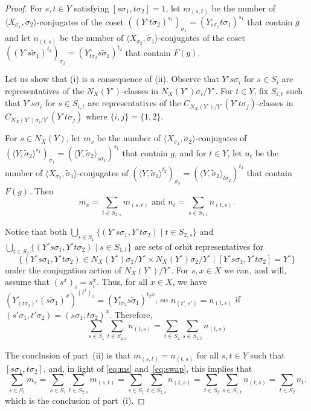 \documentclass[11pt]{article}
\numberwithin{equation}{section}
\theoremstyle{shdefinition}
\theoremstyle{shplain}
\newcommand{\s}{\sigma}
\newcommand{\ws}{\widetilde{\sigma}}
\newcommand{\<}{\langle}
\renewcommand{\>}{\rangle}
\renewcommand{\:}{\colon}
\begin{document}
\begin{proof}
For $s,t \in Y$ satisfying $[s\s_1,t\s_2]=1$, let $m_{(s,t)}$ be the number of $\<X_{\s_1},\ws_2\>$-conjugates of the coset $((Y^\circ t\ws_2)^{s_1})_{\s_1} = (Y^\circ_{s\s_2}t\ws_1)^{s_1}$ that contain $g$ and let $n_{(t,s)}$ be the number of $\<X_{\s_2},\ws_1\>$-conjugates of the coset $((Y^\circ s\ws_1)^{t_2})_{\s_2} = (Y^\circ_{t\s_2}s\ws_1)^{t_2}$ that contain $F(g)$. 

Let us show that (i) is a consequence of (ii). Observe that $Y^\circ s\s_i$ for $s \in S_i$ are representatives of the $N_X(Y^\circ)$-classes in $N_X(Y^\circ)\s_i/Y^\circ$. For $t \in Y$, fix $S_{i,t}$ such that $Y^\circ s\s_i$ for $s \in S_{i,t}$ are representatives of the $C_{N_X(Y^\circ)/Y^\circ}(Y^\circ t\s_j)$-classes in $C_{N_X(Y^\circ)\s_i/Y^\circ}(Y^\circ t\s_j)$ where $\{ i,j \} = \{1,2\}$.

For $s \in N_X(Y)$, let $m_s$ be the number of $\<X_{\s_1},\ws_2\>$-conjugates of $(\<Y,\ws_2\>^{s_1})_{\s_1} = (\<Y,\ws_2\>_{s\s_1})^{s_1}$ that contain $g$, and for $t \in Y$, let $n_t$ be the number of $\<X_{\s_2},\ws_1\>$-conjugates of $(\<Y,\ws_1\>^{t_2})_{\s_2} = (\< Y,\ws_2\>_{t\s_2})^{t_2}$ that contain $F(g)$. Then
\begin{equation} \label{eq:ms}
\text{$m_s = \sum_{t \in S_{2,s}} m_{(s,t)}$ and $n_t = \sum_{s \in S_{1,t}} n_{(t,s)}$.}
\end{equation}

Notice that both $\bigcup_{s \in S_1}\{ (Y^\circ s\s_1, Y^\circ t\s_2) \mid t \in S_{2,s} \}$ and $\bigcup_{t \in S_2}\{ (Y^\circ s\s_1, Y^\circ t\s_2) \mid s \in S_{1,t} \}$ are sets of orbit representatives for 
\[
\{ (Y^\circ s\s_1, Y^\circ t\s_2) \in N_X(Y^\circ)\s_1/Y^\circ \times N_X(Y^\circ)\s_2/Y^\circ \mid [Y^\circ s\s_1, Y^\circ t\s_2] = Y^\circ \}
\] 
under the conjugation action of $N_X(Y^\circ)/Y^\circ$. For $s, x \in X$ we can, and will, assume that $(s^x)_i = s_i^x$. Thus, for all $x \in X$, we have $(Y^\circ_{(t\s_2)^x}(s\ws_1)^x)^{(t^x)_2} = (Y^\circ_{t\s_2}s\ws_1)^{t_2x}$, so $n_{(t',s')} = n_{(t,s)}$ if $(s'\s_1,t'\s_2) = (s\s_1,t\s_2)^x$. Therefore,
\begin{equation} \label{eq:swap}
\sum_{s \in S_1}\sum_{t \in S_{2,s}} n_{(t,s)} = \sum_{t \in S_2}\sum_{s \in S_{1,t}} n_{(t,s)} 
\end{equation}

The conclusion of part~(ii) is that $m_{(s,t)} = n_{(t,s)}$ for all $s,t \in Y$ such that $[s\s_1,t\s_2]$, and, in light of \eqref{eq:ms} and~\eqref{eq:swap}, this implies that
\[
\sum_{s \in S_1} m_s = \sum_{s \in S_1}\sum_{t \in S_{2,s}} m_{(s,t)} = \sum_{s \in S_1}\sum_{t \in S_{2,s}} n_{(t,s)} = \sum_{t \in S_2}\sum_{s \in S_{1,t}} n_{(t,s)} = \sum_{t \in S_2} n_t.
\]
which is the conclusion of part~(i).


\end{proof}
\end{document}
